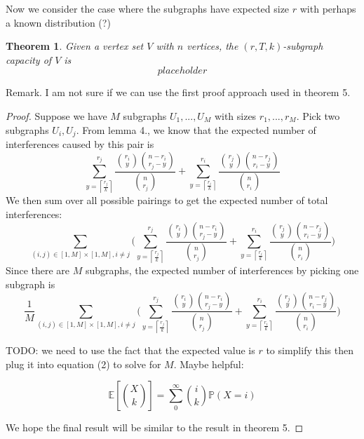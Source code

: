 \documentclass[10pt]{extarticle}
\newcommand{\E}{\mathbb{E}}
\newtheorem{theorem}{Theorem}
\theoremstyle{definition}
\begin{document}
Now we consider the case where the subgraphs have expected size $r$ with perhaps a known distribution (?)

\begin{theorem}
    Given a vertex set $V$ with $n$ vertices, the $(r,T,k)$-subgraph capacity of $V$ is 
    \begin{equation*}
        placeholder
    \end{equation*}
\end{theorem}

Remark. I am not sure if we can use the first proof approach used in theorem 5. 

\begin{proof}
    Suppose we have $M$ subgraphs $U_1,...,U_M$ with sizes $r_1,...,r_M$. Pick two subgraphs $U_i,U_j$. From lemma 4., we know that the expected number of interferences caused by this pair is
    $$
    \sum_{y = \left\lceil \frac{r_j}{k} \right\rceil}^{r_j}  \frac{\binom{r_i}{y} \binom{n-r_i}{r_j-y}}{\binom{n}{r_j}} + \sum_{y = \left\lceil \frac{r_i}{k} \right\rceil}^{r_i}  \frac{\binom{r_j}{y} \binom{n-r_j}{r_i-y}}{\binom{n}{r_i}}
    $$
    We then sum over all possible pairings to get the expected number of total interferences:
    $$
    \sum_{(i,j) \in [1,M]\times[1,M], i \ne j} \Biggl( \sum_{y = \left\lceil \frac{r_j}{k} \right\rceil}^{r_j}  \frac{\binom{r_i}{y} \binom{n-r_i}{r_j-y}}{\binom{n}{r_j}} + \sum_{y = \left\lceil \frac{r_i}{k} \right\rceil}^{r_i}  \frac{\binom{r_j}{y} \binom{n-r_j}{r_i-y}}{\binom{n}{r_i}} \Biggr)
    $$
    Since there are $M$ subgraphs, the expected number of interferences by picking one subgraph is
    $$
    \frac{1}{M} \sum_{(i,j) \in [1,M]\times[1,M], i \ne j} \Biggl( \sum_{y = \left\lceil \frac{r_j}{k} \right\rceil}^{r_j}  \frac{\binom{r_i}{y} \binom{n-r_i}{r_j-y}}{\binom{n}{r_j}} + \sum_{y = \left\lceil \frac{r_i}{k} \right\rceil}^{r_i}  \frac{\binom{r_j}{y} \binom{n-r_j}{r_i-y}}{\binom{n}{r_i}} \Biggr)
    $$


    
    TODO: we need to use the fact that the expected value is $r$ to simplify this then plug it into equation (2) to solve for $M$. Maybe helpful:

    $$
    \E \left[ \binom{X}{k} \right] = \sum_{0}^{\infty} \binom{i}{k} \mathbb{P}(X=i)
    $$
    
    
    We hope the final result will be similar to the result in theorem 5. 

    
\end{proof}
\end{document}
